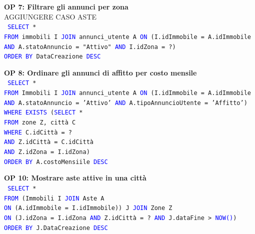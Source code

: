 \documentclass[a4paper,12pt]{report}
\begin{document}
            \noindent
            \textbf{OP 7: Filtrare gli annunci per zona} \\
            AGGIUNGERE CASO ASTE \\
            \texttt{
                \textcolor{blue}{SELECT} * \\
                \textcolor{blue}{FROM} immobili I \textcolor{blue}{JOIN} annunci\_utente A \textcolor{blue}{ON} (I.idImmobile = A.idImmobile \\
                \textcolor{blue}{AND} A.statoAnnuncio = "Attivo" \textcolor{blue}{AND} I.idZona = ?) \\
                \textcolor{blue}{ORDER BY} DataCreazione   \textcolor{blue}{DESC} \\
            }

            \noindent
            \textbf{OP 8: Ordinare gli annunci di affitto per costo mensile} \\
            \texttt{
                \textcolor{blue}{SELECT} * \\
                \textcolor{blue}{FROM} Immobili I \textcolor{blue}{JOIN} annunci\_utente A \textcolor{blue}{ON} (I.idImmobile = A.idImmobile \textcolor{blue}{AND} A.statoAnnuncio = 'Attivo' \textcolor{blue}{AND} A.tipoAnnuncioUtente = 'Affitto') \\
                \textcolor{blue}{WHERE EXISTS} (\textcolor{blue}{SELECT} * \\
                    \null\qquad\qquad\qquad\quad\textcolor{blue}{FROM} zone Z, città C \\
                    \null\qquad\qquad\qquad\quad\textcolor{blue}{WHERE} C.idCittà = ? \\
                    \null\qquad\qquad\qquad\quad\textcolor{blue}{AND} Z.idCittà = C.idCittà \\
                    \null\qquad\qquad\qquad\quad\textcolor{blue}{AND} Z.idZona = I.idZona) \\
                \textcolor{blue}{ORDER BY} A.costoMensiile \textcolor{blue}{DESC} \\
            }
            
            \noindent
            \textbf{OP 10: Mostrare aste attive in una città} \\
            \texttt{
                \textcolor{blue}{SELECT} * \\
                \textcolor{blue}{FROM} (Immobili I \textcolor{blue}{JOIN} Aste A \\ 
                \textcolor{blue}{ON} (A.idImmobile = I.idImmobile)) J \textcolor{blue}{JOIN} Zone Z \\ 
                \textcolor{blue}{ON} (J.idZona = I.idZona \textcolor{blue}{AND} Z.idCittà = ? \textcolor{blue}{AND} J.dataFine > \textcolor{blue}{NOW()}) \\
                \textcolor{blue}{ORDER BY} J.DataCreazione  \textcolor{blue}{DESC} \\
            }
            
\end{document}
